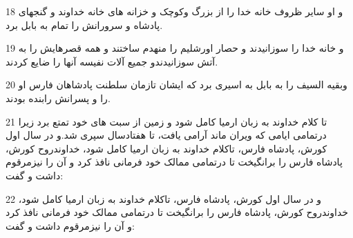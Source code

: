 \par 18 و او سایر ظروف خانه خدا را از بزرگ وکوچک و خزانه های خانه خداوند و گنجهای پادشاه و سرورانش را تمام به بابل برد.
\par 19 و خانه خدا را سوزانیدند و حصار اورشلیم را منهدم ساختند و همه قصرهایش را به آتش سوزانیدندو جمیع آلات نفیسه آنها را ضایع کردند.
\par 20 وبقیه السیف را به بابل به اسیری برد که ایشان تازمان سلطنت پادشاهان فارس او را و پسرانش رابنده بودند.
\par 21 تا کلام خداوند به زبان ارمیا کامل شود و زمین از سبت های خود تمتع برد زیرا درتمامی ایامی که ویران ماند آرامی یافت، تا هفتادسال سپری شد.و در سال اول کورش، پادشاه فارس، تاکلام خداوند به زبان ارمیا کامل شود، خداوندروح کورش، پادشاه فارس را برانگیخت تا درتمامی ممالک خود فرمانی نافذ کرد و آن را نیزمرقوم داشت و گفت:
\par 22 و در سال اول کورش، پادشاه فارس، تاکلام خداوند به زبان ارمیا کامل شود، خداوندروح کورش، پادشاه فارس را برانگیخت تا درتمامی ممالک خود فرمانی نافذ کرد و آن را نیزمرقوم داشت و گفت:


